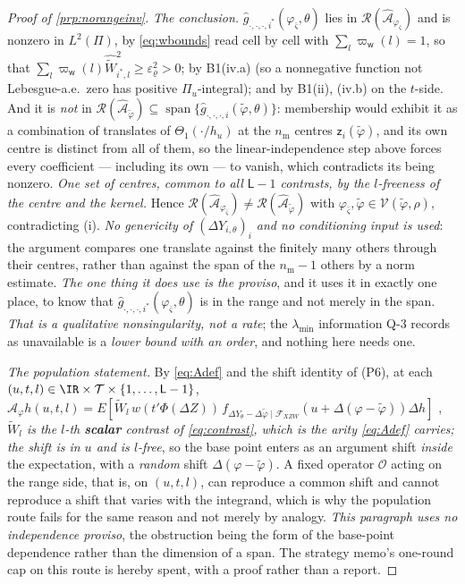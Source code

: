 \begin{proof}[Proof of \cref{prp:norangeinv}]
\emph{The conclusion.} $\hat g_{\cdot,\cdot,\cdot,i^\ast}(\varphi_{\bar\varsigma},\theta)$ lies in
$\mathcal R(\hat{\mathcal A}_{\varphi_{\bar\varsigma}})$ and is nonzero in $L^{2}(\Pi)$, by
\eqref{eq:wbounds} read cell by cell with $\sum_l\varpi_{\mathsf w}(l)=1$, so that
$\sum_l\varpi_{\mathsf w}(l)\widehat{\widetilde W}_{i^\ast,l}^{2}\ge\varepsilon_\varrho^{2}>0$; by
B1(iv.a) (so a nonnegative function not Lebesgue-a.e.\ zero has positive
$\Pi_u$-integral); and by B1(ii), (iv.b) on the $t$-side. And it is \emph{not} in
$\mathcal R(\hat{\mathcal A}_{\tilde\varphi})\subseteq\operatorname{span}\{\hat g_{\cdot,\cdot,\cdot,i}(\tilde\varphi,\theta)\}$:
membership would exhibit it as a combination of translates of $\Theta_1(\cdot/h_u)$ at the $n_{\mathrm m}$
centres $\mathsf z_i(\tilde\varphi)$, and its own centre is distinct from all of them, so the
linear-independence step above forces every coefficient --- including its own --- to vanish, which
contradicts its being nonzero. \emph{One set of centres, common to all $\mathsf L-1$ contrasts, by the
$l$-freeness of the centre and the kernel.}
Hence $\mathcal R(\hat{\mathcal A}_{\varphi_{\bar\varsigma}})\ne\mathcal R(\hat{\mathcal A}_{\tilde\varphi})$
with $\varphi_{\bar\varsigma},\tilde\varphi\in\mathcal V(\tilde\varphi,\rho)$, contradicting (i).
\emph{No genericity of $(\Delta Y_{i,\theta})_i$ and no conditioning input is used}: the argument
compares one translate against the finitely many others through their centres, rather than
against the span of the $n_{\mathrm m}-1$ others by a norm estimate. \emph{The one thing it does use is the proviso}, and
it uses it in exactly one place, to know that $\hat g_{\cdot,\cdot,\cdot,i^\ast}(\varphi_{\bar\varsigma},\theta)$
is in the range and not merely in the span. \emph{That is a qualitative nonsingularity, not a rate};
the $\lambda_{\min}$ information Q-3 records as unavailable is a \emph{lower bound with an order}, and
nothing here needs one.

\emph{The population statement.} By \eqref{eq:Adef} and the shift identity of (P6), at each
$(u,t,l)\in\IR\times\mathcal T\times\{1,\dots,\mathsf L-1\}$,
$\mathcal A_\varphi h(u,t,l)=E[\widetilde W_l\,w(t'\Phi(\Delta Z))\,f_{\Delta Y_\theta-\Delta\tilde\varphi\mid\mathcal F_{XZW}}(u+\Delta(\varphi-\tilde\varphi))\Delta h]$
, \emph{$\widetilde W_l$ is the $l$-th \textbf{scalar} contrast of \eqref{eq:contrast}, which is the
arity \eqref{eq:Adef} carries; the shift is in $u$ and is $l$-free}, 
so the base point enters as an argument shift \emph{inside} the expectation, with a \emph{random} shift
$\Delta(\varphi-\tilde\varphi)$. A fixed operator $\mathcal O$ acting on the range side, that is, on
$(u,t,l)$, can reproduce a
common shift and cannot reproduce a shift that varies with the integrand, which is why the population
route fails for the same reason and not merely by analogy. \emph{This paragraph uses no independence
proviso}, the obstruction being the form of the base-point dependence rather than the dimension of a
span. The strategy memo's one-round cap on
this route is hereby spent, with a proof rather than a report.
\end{proof}

